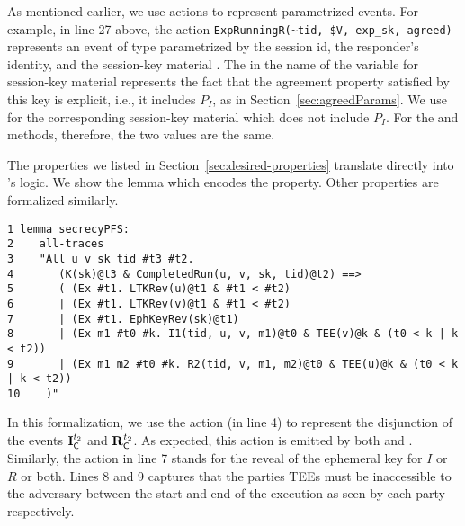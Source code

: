 \documentclass[runningheads]{llncs}
\begin{document}
As mentioned earlier, we use actions to represent parametrized events.
%
For example, in line 27 above, the action
\verb|ExpRunningR(~tid, $V, exp_sk, agreed)| represents an event of type
\mRStart{} parametrized by the session id, the responder's identity, and the
session-key material .
%
The  in the name of the variable for session-key material represents
the fact that the agreement property satisfied by this key is explicit, i.e.,
it includes $P_{I}$, as in Section~\ref{sec:agreedParams}.
%
We use  for the corresponding session-key material which does 
not
include $P_{I}$.
%
For the \mSigSig{} and \mSigStat{} methods, therefore, the two values are the
same.
%

The properties we listed in Section~\ref{sec:desired-properties}
translate directly into \mTamarin's logic.
%
We show the \mTamarin{} lemma which encodes the \mPredPcs{} property.
%
Other properties are formalized similarly. 
%

\begin{scriptsize}
\begin{verbatim}
1 lemma secrecyPFS:
2    all-traces
3    "All u v sk tid #t3 #t2.
4       (K(sk)@t3 & CompletedRun(u, v, sk, tid)@t2) ==>
5       ( (Ex #t1. LTKRev(u)@t1 & #t1 < #t2)
6       | (Ex #t1. LTKRev(v)@t1 & #t1 < #t2)
7       | (Ex #t1. EphKeyRev(sk)@t1)
8       | (Ex m1 #t0 #k. I1(tid, u, v, m1)@t0 & TEE(v)@k & (t0 < k | k < t2))
9       | (Ex m1 m2 #t0 #k. R2(tid, v, m1, m2)@t0 & TEE(u)@k & (t0 < k | k < t2))
10    )"
\end{verbatim}
\end{scriptsize}
%

In this formalization, we use the action 
(in line 4) to represent the disjunction of the events $\mathbf{I}_{\textsf{C}}^{t_{2}}$
and $\mathbf{R}_{\textsf{C}}^{t_{2}}$.
%
As expected, this action is emitted by both  and .
%
Similarly, the action  in line 7 stands for the reveal of
the ephemeral key for $I$ or $R$ or both.
%
Lines 8 and 9 captures that the parties TEEs must be inaccessible to the
adversary between the start and end of the execution as seen by each party
respectively.
%

\end{document}
